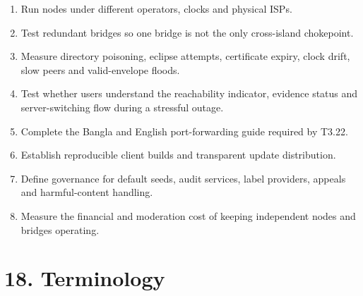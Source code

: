 \documentclass[12pt,a4paper]{article}
\begin{document}
\begin{enumerate}
\item Run nodes under different operators, clocks and physical ISPs.


\item Test redundant bridges so one bridge is not the only cross-island chokepoint.


\item Measure directory poisoning, eclipse attempts, certificate expiry, clock drift, slow peers and valid-envelope floods.


\item Test whether users understand the reachability indicator, evidence status and server-switching flow during a stressful outage.


\item Complete the Bangla and English port-forwarding guide required by T3.22.


\item Establish reproducible client builds and transparent update distribution.


\item Define governance for default seeds, audit services, label providers, appeals and harmful-content handling.


\item Measure the financial and moderation cost of keeping independent nodes and bridges operating.


\end{enumerate}
\section*{18. Terminology}
\end{document}
